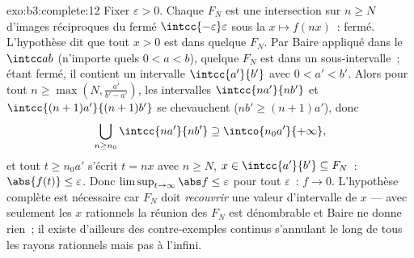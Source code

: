 \begin{solution}{exo:b3:complete:12}
Fixer $\varepsilon > 0$. Chaque $F_N$ est une intersection
sur $n \geq N$ d'images réciproques du fermé
$\intcc{-\varepsilon}\varepsilon$ sous la  $x \mapsto
f(nx)$~: fermé. L'hypothèse dit que tout $x > 0$ est dans
quelque $F_N$. Par Baire appliqué dans le  $\intcc ab$
(n'importe quels $0 < a < b$), quelque $F_N$ est  dans
un sous-intervalle~; étant fermé, il contient un intervalle
$\intcc{a'}{b'}$ avec $0 < a' < b'$. Alors pour tout $n \geq
\max(N, \frac{a'}{b' - a'})$, les intervalles
$\intcc{na'}{nb'}$ et $\intcc{(n+1)a'}{(n+1)b'}$ se
chevauchent ($nb' \geq (n+1)a'$), donc
\[
\bigcup_{n \geq n_0}\intcc{na'}{nb'} \supseteq
\intco{n_0a'}{+\infty},
\]
et tout $t \geq n_0a'$ s'écrit $t = nx$ avec $n \geq N$, $x
\in \intcc{a'}{b'} \subseteq F_N$~: $\abs{f(t)} \leq
\varepsilon$. Donc $\limsup_{t\to\infty}\abs f \leq
\varepsilon$ pour tout $\varepsilon$~: $f \to 0$.
L'hypothèse complète est nécessaire car $F_N$ doit
\emph{recouvrir} une valeur d'intervalle de $x$ --- avec
seulement les $x$ rationnels la réunion des $F_N$ est
dénombrable et Baire ne donne rien~; il existe d'ailleurs des
contre-exemples continus s'annulant le long de tous les
rayons rationnels mais pas à l'infini.
\end{solution}
